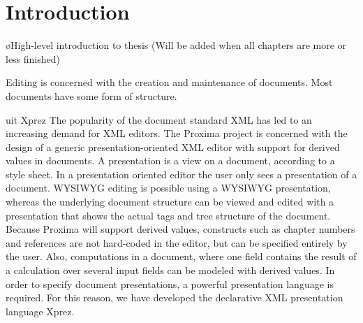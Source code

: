 \chapter{Introduction}
\label{chap:introduction}






%								
%								
%								



\bl
\o High-level introduction to thesis (Will be added when all chapters are more or less finished)
\el

\bc
Editing is concerned with the creation and maintenance of documents.  
Most documents have some form of structure. 
\ec

\bc uit Xprez
The popularity of the document standard XML has led to an increasing demand for XML editors. The Proxima project is concerned with the design of a generic presentation-oriented XML editor with support for derived values in documents. A presentation is a view on a document, according to a style sheet. In a presentation oriented editor the user only sees a presentation of a document. WYSIWYG editing is possible using a WYSIWYG presentation, whereas the underlying document structure can be viewed and edited with a presentation that shows the actual tags and tree structure of the document. Because Proxima will support derived values, constructs such as chapter numbers and references are not hard-coded in the editor, but can be specified entirely by the user. Also, computations in a document, where one field contains the result of a calculation over several input fields can be modeled with derived values. In order to specify document presentations, a powerful presentation language is required. For this reason, we have developed the declarative XML presentation language {\sc Xprez}.
\ec




%
%
%
%
%




